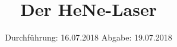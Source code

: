 

\subject{V61}
\title{Der HeNe-Laser}
\date{
\centering
  Durchführung: 16.07.2018
  \hspace{3em}
  Abgabe: 19.07.2018
}



\maketitle
\thispagestyle{empty}
\tableofcontents
\newpage



%




\printbibliography


